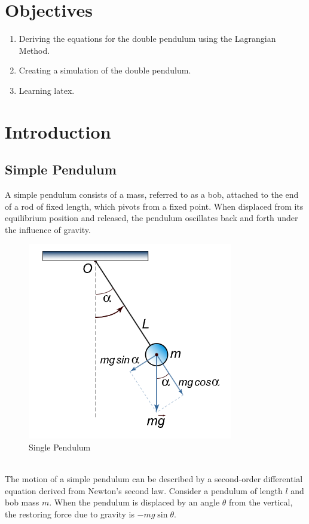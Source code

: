 \documentclass{article}
\begin{document}
\newpage
\tableofcontents
\vspace{1cm}
\listoffigures

\newpage
\section{Objectives}
\begin{enumerate}
    \item Deriving the equations for the double pendulum using the Lagrangian Method.
    \item Creating a simulation of the double pendulum.
    \item Learning latex.
\end{enumerate}
\newpage
\section{Introduction}

\subsection{Simple Pendulum}
A simple pendulum consists of a mass, referred to as a bob, attached to the end of a rod of fixed length, which pivots from a fixed point. When displaced from its equilibrium position and released, the pendulum oscillates back and forth under the influence of gravity.
\\
\begin{figure}[h]
        \centering
        \includegraphics[width=0.45\linewidth]{single.png}
        \caption{Single Pendulum}
\end{figure}\\
The motion of a simple pendulum can be described by a second-order differential equation derived from Newton’s second law. Consider a pendulum of length \( l \) and bob mass \( m \). When the pendulum is displaced by an angle \( \theta \) from the vertical, the restoring force due to gravity is \( -mg \sin \theta \).
\end{document}
